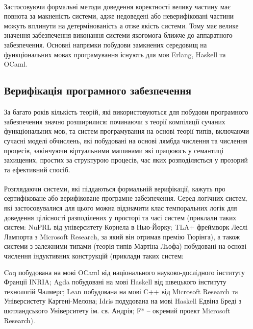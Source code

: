 \documentclass[11pt,oneside]{article}
\begin{document}
   \paragraph{}
   Застосовуючи формальні методи доведення коректності велику частину має повнота за макненість системи,
   адже недоведені або неверифіковані частини можуть вплинути на детермінованість а отже якість системи.
   Тому має велике значення забезпечення виконання системи якогомога ближче до аппаратного забезпечення.
   Основні напрямки побудови замкнених середовищ на функціональних мовах програмування
   існують для мов Erlang, Haskell та OCaml.

\newpage
\subsection{Верифікація програмного забезпечення}

   \paragraph{}
   За багато років кількість теорій, які використовуються для побудови програмного забезпечення значно розширилися:
   починаючи з теорії компіляції сучаних функціональних мов, та систем програмування на основі теорії типів,
   включаючи сучасні моделі обчислень, які побудовані на основі лямбда числення та числення процесів, закінчуючи віртуальними
   машинами які працююсь у семантиці захищених, простих за структурою процесів, час яких розподіляється
   у прозорий та ефективний спосіб.

   \paragraph{}
   Розглядаючи системи, які піддаються формальній верифікації, кажуть про
   сертифіковане або верифіковане програмне забезпечення. Серед логічних систем, які
   застосовувалися для цього можна відзначити клас темпоральних логік для доведення
   цілісності разподілених у просторі та часі систем (приклали таких систем: NuPRL від університету Корнела в Нью-Йорку;
   TLA+ фреймворк Леслі Лампорта з Microsoft Research, за який він отримав премію Тюрінга), а також системи з залежними
   типами (теорія типів Мартіна Льофа) побудовані на основі числення індуктивних конструкцій (приклади таких систем:

   Coq побудована на мові OCaml від національного науково-дослідного інституту Франції INRIA;
   Agda побудовані на мові Haskell від швецького інституту технологій Чалмерс;
   Lean побудована на мові C++ від Microsoft Research та Універсистету Каргені-Мелона;
   Idris подудована на мові Haskell Едвіна Бреді з шотландського Університету ім. св. Андрія;
   F* -- окремий проект Microsoft Research).
\end{document}
